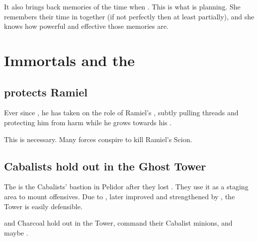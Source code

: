 It also brings back memories of the time when . 
This is what \Belzir{} is planning. 
She remembers their time in \Mystraacht{} together (if not perfectly then at least partially), and she knows how powerful and effective those memories are. 















\section{Immortals and the \Feud}









\subsection{\Azraid{} protects Ramiel}
Ever since , he has taken on the role of Ramiel's , subtly pulling threads and protecting him from harm while he grows towards his \apotheosis. 

This is necessary. 
Many forces conspire to kill Ramiel's Scion.







\subsection{Cabalists hold out in the Ghost Tower}
The  is the Cabalists' bastion in Pelidor after they lost \Malcur. They use it as a staging area to mount offensives. Due to , later improved and strengthened by \Achsah, the Tower is easily defensible. 

\Achsah{} and Charcoal hold out in the Tower, command their Cabalist minions, and maybe .





